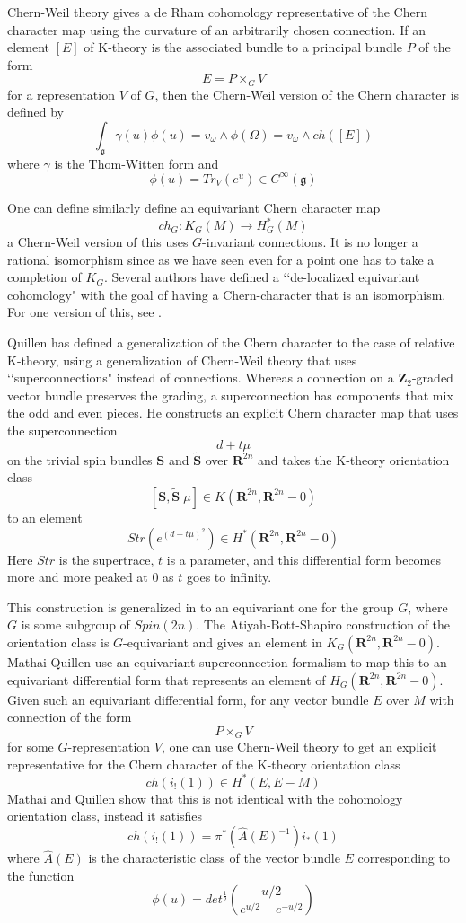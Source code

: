 \documentclass[a4paper,a4paper]{article}
\theoremstyle{conjecture}
\begin{document}
Chern-Weil theory gives a de Rham cohomology representative
of the Chern character map using the curvature of an arbitrarily chosen connection.
If an element $[E]$ of K-theory is the associated bundle to a principal bundle $P$
of the form 
$$E=P\times _G V$$
for a representation $V$ of $G$, then the Chern-Weil version of the Chern character
is defined by
$$\int_{\mathfrak g} \gamma (u)\phi(u)= v_\omega \wedge \phi(\Omega)=v_\omega \wedge ch([E])$$
where $\gamma$ is the Thom-Witten form and 
$$\phi(u)=Tr_V(e^u)\in C^\infty(\mathfrak g)$$

One can define similarly define an equivariant Chern character map
$$ch_G:K_G(M)\rightarrow H^*_G(M)$$
a Chern-Weil version of this uses $G$-invariant connections.
It is no longer a rational isomorphism since as we have seen even for a point
one has to take a completion of $K_G$.  Several authors have defined a
\lq\lq de-localized equivariant cohomology" with the goal of having a 
Chern-character that is an isomorphism. For one version of this, see \cite{Duflo-Vergne}.

Quillen \cite{Quillen} has defined a generalization of the Chern character to
the case of relative K-theory, using a generalization of Chern-Weil theory that
uses \lq\lq superconnections" instead of connections.  Whereas a connection on
a $\mathbf Z_2$-graded vector bundle preserves the grading, a superconnection has
components that mix the odd and even pieces. He constructs an explicit Chern
character map that uses the superconnection
$$d+t\mu$$ on the trivial spin bundles $\mathbf S$ and $\mathbf {\widetilde S}$ over $\mathbf R^{2n}$
and takes the K-theory orientation 
class
$$[{\mathbf S}, {\mathbf {\widetilde S}}\; \mu]\in K(\mathbf R^{2n}, \mathbf R^{2n}-0)$$
to an element 
$$ Str( e^{(d+t\mu)^2}) \in H^*(\mathbf R^{2n}, \mathbf R^{2n}-0)$$
Here $Str$ is the supertrace, $t$ is a parameter, and this differential form becomes more and more
peaked at $0$ as $t$ goes to infinity.

This construction is generalized in \cite{Mathai-Quillen} to an equivariant one for
the group $G$, where $G$ is some subgroup of $Spin(2n)$. The Atiyah-Bott-Shapiro
construction of the orientation class is $G$-equivariant and gives an element in
$K_G(\mathbf R^{2n}, \mathbf R^{2n}-0)$. Mathai-Quillen use an equivariant 
superconnection formalism to map this to an equivariant differential form that 
represents an element of $H_G(\mathbf R^{2n}, \mathbf R^{2n}-0)$.
Given such an equivariant differential form, for any vector bundle $E$ over $M$ with connection of the form
$$P\times_G V$$
for some $G$-representation $V$, one can use Chern-Weil theory to get an explicit representative
for the Chern character of the K-theory orientation class
$$ch(i_!(1))\in H^*(E,E-M)$$ 
Mathai and Quillen show that this is not identical with the cohomology orientation class, 
instead it satisfies
$$ch(i_!(1))=\pi^*(\hat A(E)^{-1})i_*(1)$$
where $\hat A(E)$ is the characteristic class of the vector bundle $E$ corresponding to the function
$$\phi(u)=det^{\frac{1}{2}} (\frac{u/2}{e^{u/2}-e^{-u/2}})$$ 
\end{document}
